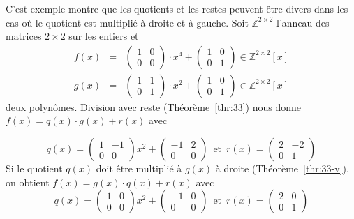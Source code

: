 \begin{example}
  \label{exe:60-right-left-div}
  C'est exemple montre que les quotients et les restes peuvent être divers dans les cas où le quotient est multiplié à droite et à gauche. 
Soit $ℤ^{2 ×2}$ l'anneau des matrices $2×2$ sur les entiers et 
\begin{eqnarray*} 
  f(x) & = &    \left(\begin{array}{rr}
1 & 0 \\
0 & 0
\end{array}\right) ⋅ x^4  + \left(\begin{array}{rr}
1 & 0 \\
0 & 1
\end{array}\right) ∈ ℤ^{2 ×2} [x] \\
             g(x) &=&  
\left(\begin{array}{rr}
1 & 1 \\
0 & 1
\end{array}\right)
⋅ x^{2} +  \left(\begin{array}{rr}
1 & 0 \\
0 & 1
\end{array}\right) ∈ ℤ^{2 ×2} [x]
\end{eqnarray*}
deux polynômes.
Division avec reste (Théorème~\ref{thr:33}) nous donne $f(x) = q(x) ⋅g(x) + r(x)$ avec

\begin{displaymath}
q(x) =  \left(\begin{array}{rr}
1 & -1 \\
0 & 0
\end{array}\right) x^{2}  + \left(\begin{array}{rr}
-1 & 2 \\
0 & 0
\end{array}\right) \, \text{ et } \, 
r(x) =  \left(\begin{array}{rr}
2 & -2 \\
0 & 1
\end{array}\right)
\end{displaymath}
Si le quotient $q(x)$ doit être multiplié à $g(x)$ à droite (Théorème~\ref{thr:33-v}), on obtient
$f(x) = g(x) ⋅ q(x) + r(x)$ avec
\begin{displaymath}
  q(x) =  \left(\begin{array}{rr}
1 & 0 \\
0 & 0
\end{array}\right) x^{2} + \left(\begin{array}{rr}
-1 & 0 \\
0 & 0
\end{array}\right)  \, \text{ et } \, 
r(x) =  \left(\begin{array}{rr}
2 & 0 \\
0 & 1
\end{array}\right)
\end{displaymath}

\end{example}




